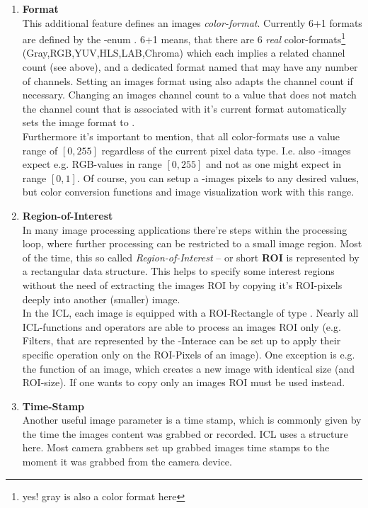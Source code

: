 \begin{enumerate}
\item \textbf{Format}\\
This additional feature defines an images \emph{color-format}. Currently 6+1 formats are defined by the -enum . 6+1 means, that there are 6 \emph{real} color-formats\footnote{yes! gray is also a color format here} (Gray,RGB,YUV,HLS,LAB,Chroma) which each implies a related channel count (see above), and a dedicated format named  that may have any number of channels. Setting an images format using  also adapts the channel count if necessary. Changing an images channel count to a value that does not match the channel count that is associated with it's current format automatically sets the image format to .\\
Furthermore it's important to mention, that all color-formats use a value range of $[0,255]$ regardless of the current pixel data type. I.e. also -images expect e.g. RGB-values in range $[0,255]$ and not as one might expect in range $[0,1]$. Of course, you can setup a -images pixels to any desired values, but color conversion functions  and image visualization work with this range.

\item \textbf{Region-of-Interest}\\
In many image processing applications there're steps within the processing loop, where further processing can be restricted to a small image region. Most of the time, this so called \emph{Region-of-Interest} -- or short \textbf{ROI} is represented by a rectangular data structure. This helps to specify some interest regions without the need of extracting the images ROI by copying it's ROI-pixels deeply into another (smaller) image.\\
In the ICL, each image is equipped with a ROI-Rectangle of type  . Nearly all ICL-functions and operators are able to process an images ROI only (e.g. Filters, that are represented by the -Interace  can be set up to apply their specific operation only on the ROI-Pixels of an image). One exception is e.g. the  function of an image, which creates a new image with
identical size (and ROI-size). If one wants to copy only an images ROI  must be used instead. 

\item \textbf{Time-Stamp}\\
Another useful image parameter is a time stamp, which is commonly given by the time the images content was grabbed or recorded. ICL uses a   structure here. Most camera grabbers set up grabbed images time stamps to the moment it was grabbed from the camera device.  


\end{enumerate}

